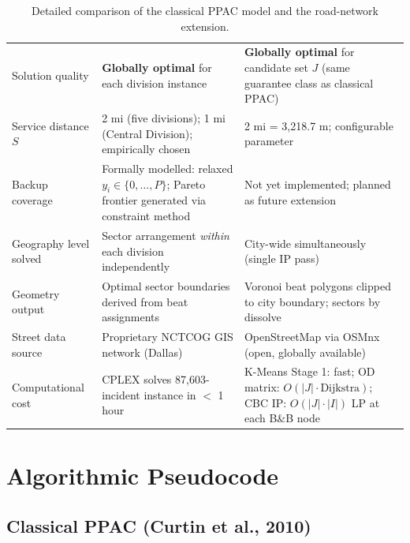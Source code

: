 \documentclass[12pt]{article}
\begin{document}
\begin{table}[h]
\begin{tabularx}{\textwidth}{@{} l X X @{}}
\addlinespace
Solution quality
    & \textbf{Globally optimal} for each division instance
    & \textbf{Globally optimal} for candidate set $J$
      (same guarantee class as classical PPAC) \\

\addlinespace
Service distance $S$
    & 2 mi (five divisions); 1 mi (Central Division); empirically chosen
    & 2 mi = 3,218.7 m; configurable parameter \\

\addlinespace
Backup coverage
    & Formally modelled: relaxed $y_i \in \{0,\dots,P\}$;
      Pareto frontier generated via constraint method
    & Not yet implemented; planned as future extension \\

\addlinespace
Geography level solved
    & Sector arrangement \emph{within} each division independently
    & City-wide simultaneously (single IP pass) \\

\addlinespace
Geometry output
    & Optimal sector boundaries derived from beat assignments
    & Voronoi beat polygons clipped to city boundary; sectors by dissolve \\

\addlinespace
Street data source
    & Proprietary NCTCOG GIS network (Dallas)
    & OpenStreetMap via OSMnx (open, globally available) \\

\addlinespace
Computational cost
    & CPLEX solves 87,603-incident instance in $<$ 1 hour
    & K-Means Stage 1: fast;
      OD matrix: $O(|J| \cdot \text{Dijkstra})$;
      CBC IP: $O(|J| \cdot |I|)$ LP at each B\&B node \\

\bottomrule
\end{tabularx}
\caption{Detailed comparison of the classical PPAC model and the road-network extension.}
\label{tab:comparison}
\end{table}

\section{Algorithmic Pseudocode}

\subsection{Classical PPAC (Curtin et al., 2010)}
\end{document}
